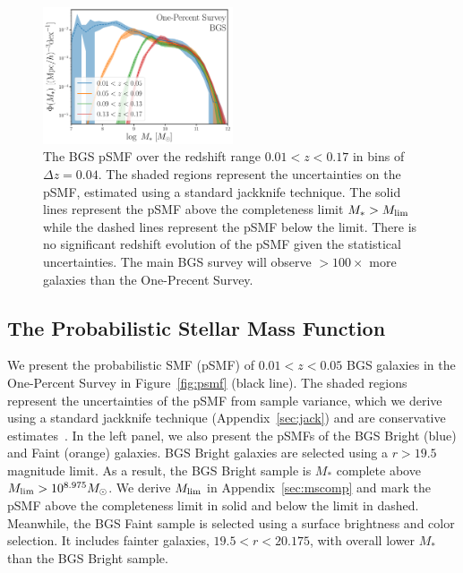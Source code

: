 \begin{figure}
\begin{center}
    \includegraphics[width=0.5\textwidth]{figs/psmf_bgs_any_zevo.pdf} 
    \caption{
        The BGS pSMF over the redshift range $0.01 < z < 0.17$ in bins of
        $\Delta z = 0.04$. 
        The shaded regions represent the uncertainties on the pSMF, estimated
        using a standard jackknife technique.
        The solid lines represent the pSMF above the completeness limit 
        $M_* > M_{\rm lim}$ while the dashed lines represent the pSMF below
        the limit.
        There is no significant redshift evolution of the pSMF given the
        statistical uncertainties. 
        The main BGS survey will observe $>100\times$ more galaxies than the
        One-Precent Survey. 
    }\label{fig:psmfz}
\end{center}
\end{figure}

\subsection{The Probabilistic Stellar Mass Function} \label{sec:psmf}
We present the probabilistic SMF (pSMF) of $0.01 < z < 0.05$ BGS galaxies in the
One-Percent Survey in Figure~\ref{fig:psmf} (black line). 
The shaded regions represent the uncertainties of the pSMF from sample variance,
which we derive using a standard jackknife technique
(Appendix~\ref{sec:jack}) and are conservative estimates~\citep{norberg2009}. 
In the left panel, we also present the pSMFs of the BGS Bright (blue) and Faint
(orange) galaxies.  
BGS Bright galaxies are selected using a $r > 19.5$ magnitude limit. 
As a result, the BGS Bright sample is $M_*$ complete above $M_{\rm lim} >
10^{8.975}M_\odot$. 
We derive $M_{\rm lim}$ in Appendix~\ref{sec:mscomp} and mark the pSMF above
the completeness limit in solid and below the limit in dashed. 
Meanwhile, the BGS Faint sample is selected using a surface brightness and
color selection.   
It includes fainter galaxies, $19.5 < r < 20.175$, with overall lower $M_*$
than the BGS Bright sample. 

